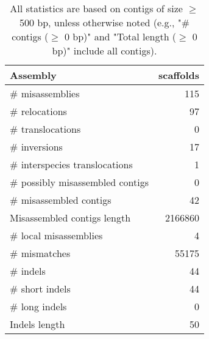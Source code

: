 \documentclass[12pt,a4paper]{article}
\begin{document}
\begin{table}[ht]
\begin{center}
\caption{All statistics are based on contigs of size $\geq$ 500 bp, unless otherwise noted (e.g., "\# contigs ($\geq$ 0 bp)" and "Total length ($\geq$ 0 bp)" include all contigs).}
\begin{tabular}{|l*{1}{|r}|}
\hline
Assembly & scaffolds \\ \hline
\# misassemblies & 115 \\ \hline
\hspace{5mm}\# relocations & 97 \\ \hline
\hspace{5mm}\# translocations & 0 \\ \hline
\hspace{5mm}\# inversions & 17 \\ \hline
\hspace{5mm}\# interspecies translocations & 1 \\ \hline
\# possibly misassembled contigs & 0 \\ \hline
\# misassembled contigs & 42 \\ \hline
Misassembled contigs length & 2166860 \\ \hline
\# local misassemblies & 4 \\ \hline
\# mismatches & 55175 \\ \hline
\# indels & 44 \\ \hline
\hspace{5mm}\# short indels & 44 \\ \hline
\hspace{5mm}\# long indels & 0 \\ \hline
Indels length & 50 \\ \hline
\end{tabular}
\end{center}
\end{table}
\end{document}
